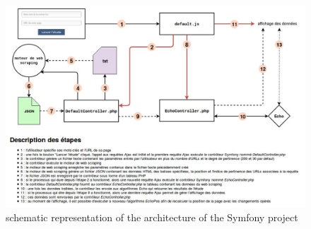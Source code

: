 \documentclass[12pt]{article}
\begin{document}
\begin{appendices}
\begin{figure}[p]
	\centering\includegraphics[scale=0.45]{architectureMachineLearning.jpg}
	\caption{schematic representation of the architecture of the Symfony project}
\end{figure}

\


\end{appendices}
\end{document}
